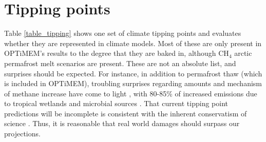 \documentclass{article}
\begin{document}
\section{Tipping points}
\label{sect:TippingPoints}
Table \ref{table_tipping} shows one set of climate tipping points and evaluates whether they are represented in climate models. Most of these are only present in OPTiMEM's results to the degree that they are baked in, although CH$_4$ arctic permafrost melt scenarios are present. These are not an absolute list, and surprises should be expected. For instance, in addition to permafrost thaw \cite{Schuur2022PermafrostFeedbacksWarming} (which is included in OPTiMEM), troubling surprises regarding amounts and mechanism of methane increase have come to light \cite{Qu2022Attribution2020methaneSurgeGOSAT,Shaw2022MethaneFluxesZambia,Feng2022MethaneResponsibleRecords2020_2021}, with 80-85\% of increased emissions due to tropical wetlands and microbial sources \cite{Feng2022TropicalMethaneEmissionsLargeFraction}  \cite{Basu2022EstimatingMethaneConsistentC-13}. That current tipping point predictions will be incomplete is consistent with the inherent conservatism of science \cite{Kemp2022ClimateEndgame}. Thus, it is reasonable that real world damages should surpass our projections. 
\end{document}

